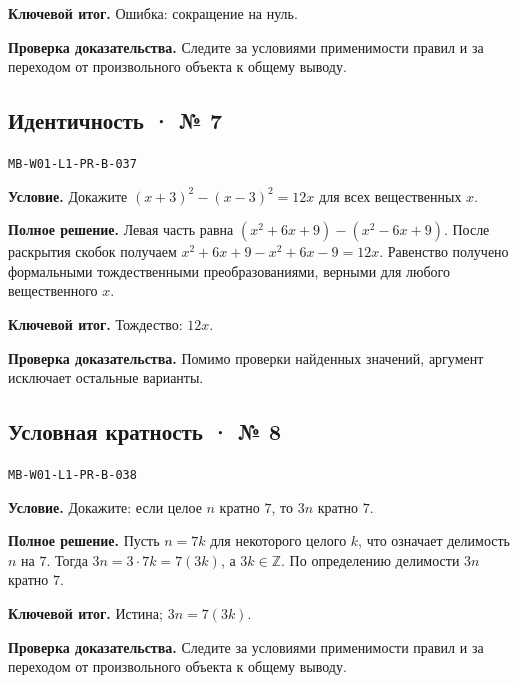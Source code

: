 \documentclass[11pt,a4paper,openany]{book}
\newcommand{\muid}[1]{\texttt{\footnotesize #1}}
\begin{document}
\begin{learnbox}\textbf{Ключевой итог.} Ошибка: сокращение на нуль.\par \textbf{Проверка доказательства.} 
Следите за условиями применимости правил и за переходом от произвольного объекта к общему выводу. 
\end{learnbox}

\subsection*{Идентичность · № 7}\hypertarget{solution:MB-W01-L1-PR-B-037}{}

\muid{MB-W01-L1-PR-B-037}\par

\textbf{Условие.} Докажите $(x+3)^2-(x-3)^2=12x$ для всех вещественных $x$.\par

\textbf{Полное решение.} Левая часть равна $(x^2+6x+9)-(x^2-6x+9)$. После раскрытия скобок получаем $x^2+6x+9-x^2+6x-9=12x$. Равенство получено формальными тождественными преобразованиями, верными для любого вещественного $x$.


\begin{learnbox}\textbf{Ключевой итог.} Тождество: $12x$.\par \textbf{Проверка доказательства.} 
Помимо проверки найденных значений, аргумент исключает остальные варианты. 
\end{learnbox}

\subsection*{Условная кратность · № 8}\hypertarget{solution:MB-W01-L1-PR-B-038}{}

\muid{MB-W01-L1-PR-B-038}\par

\textbf{Условие.} Докажите: если целое $n$ кратно $7$, то $3n$ кратно $7$.\par

\textbf{Полное решение.} Пусть $n=7k$ для некоторого целого $k$, что означает делимость $n$ на $7$. Тогда $3n=3\cdot7k=7(3k)$, а $3k\in\mathbb Z$. По определению делимости $3n$ кратно $7$.


\begin{learnbox}\textbf{Ключевой итог.} Истина; $3n=7(3k)$.\par \textbf{Проверка доказательства.} 
Следите за условиями применимости правил и за переходом от произвольного объекта к общему выводу. 
\end{learnbox}
\end{document}
